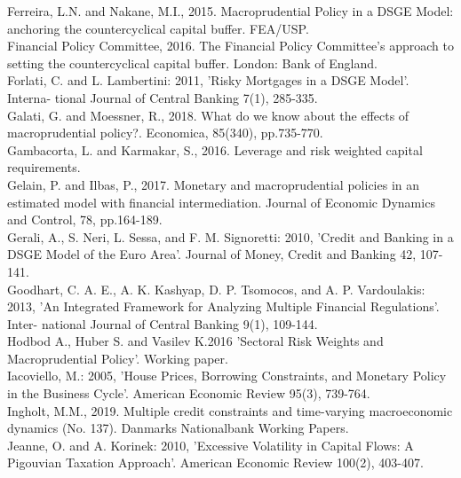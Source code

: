 \documentclass[12pt]{article}
\numberwithin{equation}{section}
\begin{document}
Ferreira, L.N. and Nakane, M.I., 2015. Macroprudential Policy in a DSGE Model: anchoring the countercyclical capital buffer. FEA/USP. \\

Financial Policy Committee, 2016. The Financial Policy Committee’s approach to setting the countercyclical capital buffer. London: Bank of England. \\

Forlati, C. and L. Lambertini: 2011, 'Risky Mortgages in a DSGE Model'. Interna-
tional Journal of Central Banking 7(1), 285-335.\\

Galati, G. and Moessner, R., 2018. What do we know about the effects of macroprudential policy?. Economica, 85(340), pp.735-770.\\

Gambacorta, L. and Karmakar, S., 2016. Leverage and risk weighted capital requirements.\\

Gelain, P. and Ilbas, P., 2017. Monetary and macroprudential policies in an estimated model with financial intermediation. Journal of Economic Dynamics and Control, 78, pp.164-189.\\

Gerali, A., S. Neri, L. Sessa, and F. M. Signoretti: 2010, 'Credit and Banking in
a DSGE Model of the Euro Area'. Journal of Money, Credit and Banking 42,
107-141.\\

Goodhart, C. A. E., A. K. Kashyap, D. P. Tsomocos, and A. P. Vardoulakis: 2013,
'An Integrated Framework for Analyzing Multiple Financial Regulations'. Inter-
national Journal of Central Banking 9(1), 109-144.\\

 Hodbod A.,  Huber S. and Vasilev K.2016 'Sectoral Risk Weights and Macroprudential Policy'. Working paper.\\
 
Iacoviello, M.: 2005, 'House Prices, Borrowing Constraints, and Monetary Policy in
the Business Cycle'. American Economic Review 95(3), 739-764.\\

Ingholt, M.M., 2019. Multiple credit constraints and time-varying macroeconomic dynamics (No. 137). Danmarks Nationalbank Working Papers.\\



Jeanne, O. and A. Korinek: 2010, 'Excessive Volatility in Capital Flows: A Pigouvian
Taxation Approach'. American Economic Review 100(2), 403-407.\\
\end{document}
